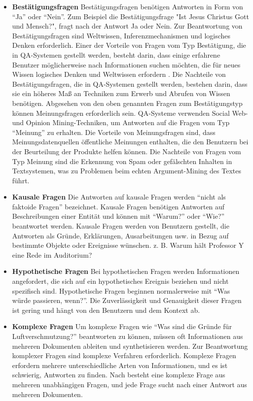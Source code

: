 \documentclass[
        ngerman,
        paper=a4,
        numbers=noendperiod,
]{scrreprt}
\begin{document}
\begin{itemize}
    \item \textbf{Bestätigungsfragen} 
    Bestätigungsfragen benötigen Antworten in Form von \enquote{Ja} oder \enquote{Nein}. Zum Beispiel die Bestätigungsfrage "Ist Jesus Christus Gott und Mensch?", fragt nach der Antwort Ja oder Nein. Zur Beantwortung von Bestätigungsfragen sind Weltwissen, Inferenzmechanismen und logisches Denken erforderlich. Einer der Vorteile von Fragen vom Typ Bestätigung, die in QA-Systemen gestellt werden, besteht darin, dass einige erfahrene Benutzer möglicherweise nach Informationen suchen möchten, die für neues Wissen logisches Denken und Weltwissen erfordern \citep{tanwar2014effective}. Die Nachteile von Bestätigungsfragen, die in QA-Systemen gestellt werden, bestehen darin, dass sie ein höheres Maß an Techniken zum Erwerb und Abrufen von Wissen benötigen. Abgesehen von den oben genannten Fragen zum Bestätigungstyp können Meinungsfragen erforderlich sein. QA-Systeme verwenden Social Web- und Opinion Mining-Techniken, um Antworten auf die Fragen vom Typ \enquote{Meinung} zu erhalten. Die Vorteile von Meinungsfragen sind, dass Meinungsdatenquellen öffentliche Meinungen enthalten, die den Benutzern bei der Beurteilung der Produkte helfen können. Die Nachteile von Fragen vom Typ Meinung sind die Erkennung von Spam oder gefälschten Inhalten in Textsystemen, was zu Problemen beim echten Argument-Mining des Textes führt.
    \item \textbf{Kausale Fragen} 
    Die Antworten auf kausale Fragen werden \enquote{nicht als faktoide Fragen} bezeichnet. Kausale Fragen benötigen Antworten auf Beschreibungen einer Entität und können mit \enquote{Warum?} oder \enquote{Wie?} beantwortet werden. Kausale Fragen werden von Benutzern gestellt, die Antworten als Gründe, Erklärungen, Ausarbeitungen usw. in Bezug auf bestimmte Objekte oder Ereignisse wünschen.
    z. B. Warum hält Professor Y eine Rede im Auditorium?
    \item \textbf{Hypothetische Fragen}
    Bei hypothetischen Fragen werden Informationen angefordert, die sich auf ein hypothetisches Ereignis beziehen und nicht spezifisch sind. Hypothetische Fragen beginnen normalerweise mit \enquote{Was würde passieren, wenn?}. Die Zuverlässigkeit und Genauigkeit dieser Fragen ist gering und hängt von den Benutzern und dem Kontext ab.
    \item \textbf{Komplexe Fragen}
    Um komplexe Fragen wie \enquote{Was sind die Gründe für Luftverschmutzung?} beantworten zu können, müssen oft Informationen aus mehreren Dokumenten ableiten und synthetisieren werden. Zur Beantwortung komplexer Fragen sind komplexe Verfahren erforderlich. Komplexe Fragen erfordern mehrere unterschiedliche Arten von Informationen, und es ist schwierig, Antworten zu finden. Nach \citep{basuki2016statistical} besteht eine komplexe Frage aus mehreren unabhängigen Fragen, und jede Frage sucht nach einer Antwort aus mehreren Dokumenten.
    
\end{itemize}
\end{document}

